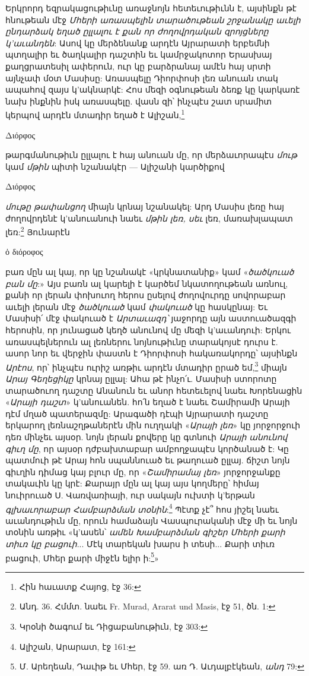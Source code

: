 \documentclass{article}
\begin{document}
{Երկրորդ եզրակացութիւնը առաջնոյն հետեւութիւնն է, այսինքն թէ հնութեան մէջ \emph{Մհերի առասպելին տարածութեան շրջանակը աւելի ընդարձակ եղած ըլլալու է քան որ ժողովրդական զրոյցները կ'աւանդեն}: Ասով կը մերձենանք արդէն Այրարատի երբեմնի պտղալիր եւ ծաղկալիր դաշտին եւ կամրջակոտոր Երասխայ քաղցրատեսիլ ափերուն, ուր կը բարձրանայ ամէն հայ սրտի այնչափ մօտ Մասիսը: Առասպելը Դիորփոսի լեռ անուան տակ ապահով զայս կ'ակնարկէ: Հոս մեզի օգնութեան ձեռք կը կարկառէ նախ ինքնին իսկ առասպելը. վասն զի՝ ինչպէս շատ սրամիտ կերպով արդէն մտադիր եղած է Ալիշան,\footnote{Հին հաւատք Հայոց, էջ 36:} \begin{greek}Διόρφος\end{greek} թարգմանութիւն ըլլալու է հայ անուան մը, որ մերձաւորապէս \emph{մութ} կամ \emph{մթին} պիտի նշանակէր — Ալիշանի կարծիքով \begin{greek}Διόρφος\end{greek} \emph{մութը թափանցող} միայն կրնայ նշանակել: Արդ Մասիս լեռը հայ ժողովրդենէ կ'անուանուի նաեւ \emph{մթին լեռ, սեւ} լեռ, մառախլապատ լեռ:\footnote{Անդ. 36. Հմմտ. նաեւ Fr. Murad, Ararat und Masis, էջ 51, ծն. 1:} Յունարէն \begin{greek}ὁ διόροφος\end{greek} բառ մըն ալ կայ, որ կը նշանակէ «կրկնատանիք» կամ «\emph{ծածկուած բան մը}:» Այս բառն ալ կարելի է կարծեմ նկատողութեան առնուլ, քանի որ լերան փոխուող հերոս ըսելով ժողովուրդը սովորաբար աւելի լերան մէջ \emph{ծածկուած} կամ \emph{փակուած} կը հասկընայ: Եւ Մասիսի՛ մէջ փակուած է \emph{Արտաւազդ՝} յաջորդը այն աստուածազգի հերոսին, որ յունացած կեղծ անունով մը մեզի կ'աւանդուի: Երկու առասպելներուն ալ լեռներու նոյնութիւնը տարակոյսէ դուրս է. ասոր նոր եւ վերջին փաստն է Դիորփոսի հակառակորդը՝ այսինքն \emph{Արէոս}, որ՝ ինչպէս ուրիշ առթիւ արդէն մտադիր ըրած եմ,\footnote{Կրօնի ծագում եւ Դիցաբանութիւն, էջ 303:} միայն \emph{Արայ Գեղեցիկը} կրնայ ըլլալ: Ահա թէ ինչո՛ւ. Մասիսի ստորոտը տարածուող դաշտը Անանուն եւ անոր հետեւելով նաեւ Խորենացին «\emph{Արայի դաշտ}» կ'անուանեն. հո՛ն եղած է նաեւ Շամիրամի Արայի դէմ մղած պատերազմը: Արագածի դէպի Այրարատի դաշտը երկարող լեռնաշղթաներէն մին ուղղակի «\emph{Արայի լեռ}» կը յորջորջուի դեռ մինչեւ այսօր. նոյն լերան քովերը կը գտնուի \emph{Արայի անունով գիւղ մը}, որ այսօր դժբախտաբար ամբողջապէս կործանած է: Կը պատմուի թէ Արայ հոն սպաննուած եւ թաղուած ըլլայ. ճիշտ նոյն գիւղին դիմաց կայ բլուր մը, որ «\emph{Շամիրամայ լեռ}» յորջորջանքը տակաւին կը կրէ: Քարայր մըն ալ կայ այս կողմերը՝ հիմայ նուիրուած Ս. Վառվառիայի, ուր սակայն ուխտի կ'երթան \emph{գլխաւորաբար Համբարձման տօնին}:\footnote{Ալիշան, Արարատ, էջ 161:} Պէտք չէ՞ հոս յիշել նաեւ աւանդութիւն մը, որուն համաձայն Վասպուրականի մէջ մի եւ նոյն տօնին առթիւ «կ'ասեն՝ \emph{ամեն Խամբարձման գիշեր Մհերի քարի տիւռ կը բացուի}... Մէկ տարեկան խարս ի տեսի... Քարի տիւռ բացուի, Մհեր քարի միջէն ելիր ի:\footnote{Մ. Արեղեան, Դաւիթ եւ Մհեր, էջ 59. առ Դ. Աւդալբէկեան, \emph{անդ} 79:}»

}
\end{document}
